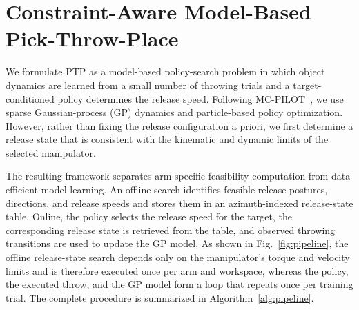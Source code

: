 \documentclass[letterpaper, 10 pt, conference]{ieeeconf}
\begin{document}




\section{Constraint-Aware Model-Based Pick-Throw-Place}
\label{sec:approach}

We formulate PTP as a model-based policy-search problem in which
object dynamics are learned from a small number of throwing trials and a
target-conditioned policy determines the release speed. Following
MC-PILOT~\cite{turcato2025mcpilot}, we use sparse Gaussian-process (GP)
dynamics and particle-based policy optimization. However, rather than fixing
the release configuration a priori, we first determine a release state that is
consistent with the kinematic and dynamic limits of the selected manipulator.

The resulting framework separates arm-specific feasibility computation from
data-efficient model learning. An offline search identifies feasible release
postures, directions, and release speeds and stores them in an azimuth-indexed
release-state table. Online, the policy selects the release speed for the
target, the corresponding release state is retrieved from the table, and
observed throwing transitions are used to update the GP model. As shown in
Fig.~\ref{fig:pipeline}, the offline release-state search depends only on the
manipulator's torque and velocity limits and is therefore executed once per
arm and workspace, whereas the policy, the executed throw, and the GP model
form a loop that repeats once per training trial. The complete procedure is
summarized in Algorithm~\ref{alg:pipeline}.
\end{document}
